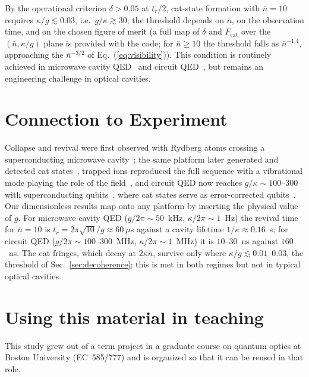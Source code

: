 \documentclass{iopjournal}
\begin{document}
By the operational criterion $\delta > 0.05$ at $t_r/2$, cat-state formation with $\bar{n} = 10$ requires $\kappa/g \lesssim 0.03$, i.e.\ $g/\kappa \gtrsim 30$; the threshold depends on $\bar{n}$, on the observation time, and on the chosen figure of merit (a full map of $\delta$ and $F_{\text{cat}}$ over the $(\bar{n}, \kappa/g)$ plane is provided with the code; for $\bar{n} \geq 10$ the threshold falls as $\bar{n}^{-1.4}$, approaching the $\bar{n}^{-3/2}$ of Eq.~(\ref{eq:visibility})). This condition is routinely achieved in microwave cavity QED~\cite{haroche2006} and circuit QED~\cite{blais2021}, but remains an engineering challenge in optical cavities.


\section{Connection to Experiment}
\label{sec:experiment}

Collapse and revival were first observed with Rydberg atoms crossing a superconducting microwave cavity~\cite{rempe1987}; the same platform later generated and detected cat states~\cite{brune1996, haroche2006}, trapped ions reproduced the full sequence with a vibrational mode playing the role of the field~\cite{meekhof1996}, and circuit QED now reaches $g/\kappa \sim 100$--$300$ with superconducting qubits~\cite{blais2021}, where cat states serve as error-corrected qubits~\cite{ofek2016}. Our dimensionless results map onto any platform by inserting the physical value of $g$. For microwave cavity QED ($g/2\pi \sim 50$~kHz, $\kappa/2\pi \sim 1$~Hz) the revival time for $\bar{n} = 10$ is $t_r = 2\pi\sqrt{10}/g \approx 60~\mu$s against a cavity lifetime $1/\kappa \approx 0.16$~s; for circuit QED ($g/2\pi \sim 100$--$300$~MHz, $\kappa/2\pi \sim 1$~MHz) it is $10$--$30$~ns against $160$~ns. The cat fringes, which decay at $2\kappa\bar{n}$, survive only where $\kappa/g \lesssim 0.01$--$0.03$, the threshold of Sec.~\ref{sec:decoherence}; this is met in both regimes but not in typical optical cavities.


\section{Using this material in teaching}
\label{sec:teaching}

This study grew out of a term project in a graduate course on quantum optics at Boston University (EC~585/777) and is organized so that it can be reused in that role.
\end{document}
